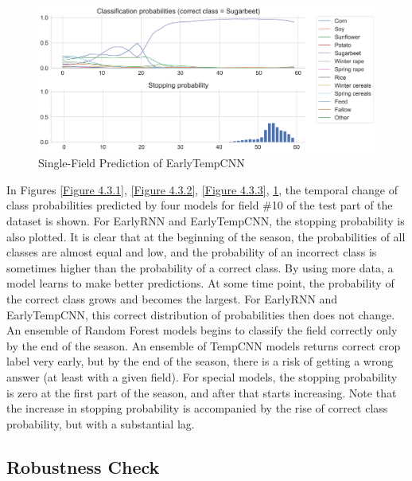 \documentclass{article}
\begin{document}
\begin{figure}
    \centering
    \includegraphics[width=\textwidth]{images/earlytempcnn_preds.png}
    \caption{Single-Field Prediction of EarlyTempCNN}
    \label{Figure 4.3.4}
\end{figure}

In Figures \ref{Figure 4.3.1}, \ref{Figure 4.3.2}, \ref{Figure 4.3.3}, \ref{Figure 4.3.4}, the temporal change of class probabilities predicted by four models for field \#10 of the test part of the dataset is shown. For EarlyRNN and EarlyTempCNN, the stopping probability is also plotted. It is clear that at the beginning of the season, the probabilities of all classes are almost equal and low, and the probability of an incorrect class is sometimes higher than the probability of a correct class. By using more data, a model learns to make better predictions. At some time point, the probability of the correct class grows and becomes the largest. For EarlyRNN and EarlyTempCNN, this correct distribution of probabilities then does not change. An ensemble of Random Forest models begins to classify the field correctly only by the end of the season. An ensemble of TempCNN models returns correct crop label very early, but by the end of the season, there is a risk of getting a wrong answer (at least with a given field). For special models, the stopping probability is zero at the first part of the season, and after that starts increasing. Note that the increase in stopping probability is accompanied by the rise of correct class probability, but with a substantial lag.

\subsection{Robustness Check}
\end{document}
